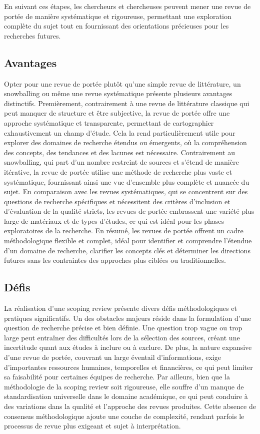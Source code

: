\documentclass[
  letterpaper,
]{scrbook}
\begin{document}
En suivant ces étapes, les chercheurs et chercheuses peuvent mener une
revue de portée de manière systématique et rigoureuse, permettant une
exploration complète du sujet tout en fournissant des orientations
précieuses pour les recherches futures.

\hypertarget{avantages-3}{%
\subsection{Avantages}\label{avantages-3}}

Opter pour une revue de portée plutôt qu'une simple revue de
littérature, un snowballing ou même une revue systématique présente
plusieurs avantages distinctifs. Premièrement, contrairement à une revue
de littérature classique qui peut manquer de structure et être
subjective, la revue de portée offre une approche systématique et
transparente, permettant de cartographier exhaustivement un champ
d'étude. Cela la rend particulièrement utile pour explorer des domaines
de recherche étendus ou émergents, où la compréhension des concepts, des
tendances et des lacunes est nécessaire. Contrairement au snowballing,
qui part d'un nombre restreint de sources et s'étend de manière
itérative, la revue de portée utilise une méthode de recherche plus
vaste et systématique, fournissant ainsi une vue d'ensemble plus
complète et nuancée du sujet. En comparaison avec les revues
systématiques, qui se concentrent sur des questions de recherche
spécifiques et nécessitent des critères d'inclusion et d'évaluation de
la qualité stricts, les revues de portée embrassent une variété plus
large de matériaux et de types d'études, ce qui est idéal pour les
phases exploratoires de la recherche. En résumé, les revues de portée
offrent un cadre méthodologique flexible et complet, idéal pour
identifier et comprendre l'étendue d'un domaine de recherche, clarifier
les concepts clés et déterminer les directions futures sans les
contraintes des approches plus ciblées ou traditionnelles.

\hypertarget{duxe9fis-1}{%
\subsection{Défis}\label{duxe9fis-1}}

La réalisation d'une scoping review présente divers défis
méthodologiques et pratiques significatifs. Un des obstacles majeurs
réside dans la formulation d'une question de recherche précise et bien
définie. Une question trop vague ou trop large peut entraîner des
difficultés lors de la sélection des sources, créant une incertitude
quant aux études à inclure ou à exclure. De plus, la nature expansive
d'une revue de portée, couvrant un large éventail d'informations, exige
d'importantes ressources humaines, temporelles et financières, ce qui
peut limiter sa faisabilité pour certaines équipes de recherche. Par
ailleurs, bien que la méthodologie de la scoping review soit rigoureuse,
elle souffre d'un manque de standardisation universelle dans le domaine
académique, ce qui peut conduire à des variations dans la qualité et
l'approche des revues produites. Cette absence de consensus
méthodologique ajoute une couche de complexité, rendant parfois le
processus de revue plus exigeant et sujet à interprétation.
\end{document}
